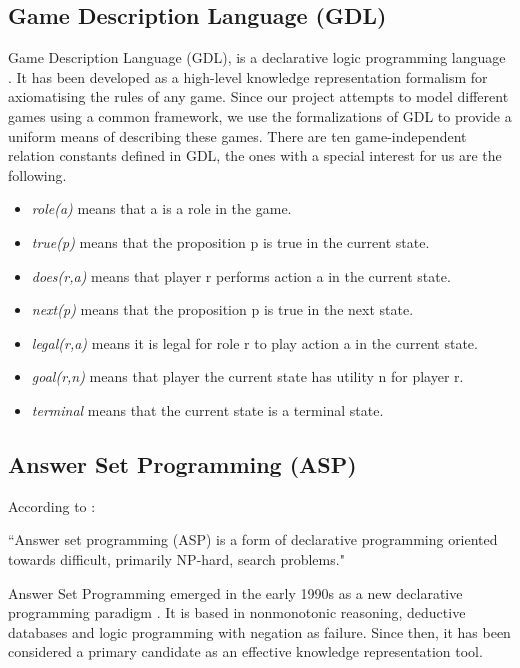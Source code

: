 \subsection{Game Description Language (GDL)}

Game Description Language (GDL), is a declarative logic programming language \citep{genesereth2005general}. It has been developed as a high-level knowledge representation formalism for axiomatising the rules of any game. Since our project attempts to model different games using a common framework, we use the formalizations of GDL to provide a uniform means of describing these games. There are ten game-independent relation constants defined in GDL, the ones with a special interest for us are the following.
\begin{itemize}
    \item \textit{role(a)} means that a is a role in the game.
    \item \textit{true(p)} means that the proposition p is true in the current state.
    \item \textit{does(r,a)} means that player r performs action a in the current state.
    \item \textit{next(p)} means that the proposition p is true in the next state.
    \item \textit{legal(r,a)} means it is legal for role r to play action a in the current state.
    \item \textit{goal(r,n)} means that player the current state has utility n for player r.
    \item \textit{terminal} means that the current state is a terminal state.    
\end{itemize}

\subsection{Answer Set Programming (ASP)}

According to \citet{lifschitz2019answer}:

\begin{displayquote}
``Answer set programming (ASP) is a form of declarative programming oriented towards difficult, primarily NP-hard, search problems."
\end{displayquote}

\justify
Answer Set Programming emerged in the early 1990s as a new declarative programming paradigm \citep{Gelfond1991}. It is based in nonmonotonic reasoning, deductive databases and logic programming with negation as failure. Since then, it has been considered a primary candidate as an effective knowledge representation tool. 

